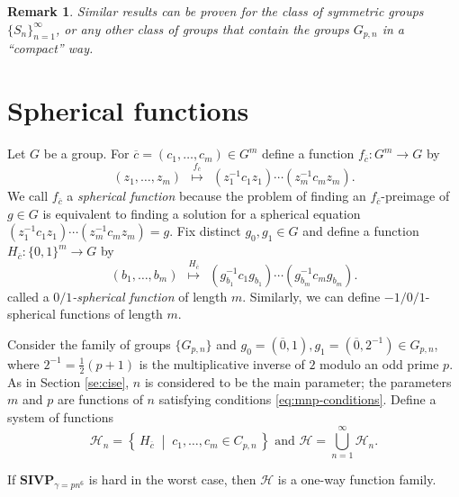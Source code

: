 \documentclass{jgcc}
\newtheorem{remark}{Remark}
\def\ovc{{\overline{c}}}
\def\ovo{{\overline{0}}}
\def\CH{{\mathcal H}}
\def\SIVP{{\mathbf{SIVP}}}
\newcommand{\Set}[2]{\left\{\, #1 \;\middle|\; #2 \,\right\}}%
\begin{document}
\begin{remark}
Similar results can be proven for the class of symmetric groups 
$\{S_n\}_{n=1}^\infty$,
or any other class of groups that contain the groups $G_{p,n}$ in a ``compact'' way.
\end{remark}


\section{Spherical functions}


Let $G$ be a group.
For $\ovc=(c_1,\dots,c_m)\in G^m$ define a function $f_\ovc\colon G^m\to G$ by
$$
(z_1,\dots,z_m) 
\ \ \stackrel{f_\ovc}{\mapsto}\ \ 
(z_1^{-1} c_1 z_1)
\cdots
(z_m^{-1} c_m z_m).
$$
We call $f_\ovc$ a \emph{spherical function} because the problem of finding
an $f_\ovc$-preimage of $g\in G$ is equivalent to finding a solution 
for a spherical equation
$(z_1^{-1} c_1 z_1)
\cdots
(z_m^{-1} c_m z_m)=g
$.
Fix distinct $g_0,g_1\in G$ and define a function $H_\ovc\colon \{0,1\}^m\to G$ by
$$
(b_1,\dots,b_m)
\ \ \stackrel{H_\ovc}{\mapsto}\ \ 
(g_{b_1}^{-1} c_1 g_{b_1})
\cdots
(g_{b_m}^{-1} c_m g_{b_m}).
$$ 
called a \emph{$0/1$-spherical function} of length $m$.
Similarly, we can define $-1/0/1$-spherical functions of length $m$.

Consider the family of groups $\{G_{p,n}\}$ and
$g_0=(\ovo,1), g_1=(\ovo,2^{-1})\in G_{p,n}$, where $2^{-1}=\tfrac{1}{2}(p+1)$ is 
the multiplicative inverse of $2$ modulo an odd prime $p$.
As in Section \ref{se:cise}, $n$ is considered to be the main parameter;
the parameters $m$ and $p$ are functions of $n$ satisfying conditions 
\eqref{eq:mnp-conditions}.
Define a system of functions
$$
\CH_n=\Set{H_\ovc}{c_1,\dots,c_m\in C_{p,n}}
\mbox{ and }
\CH= \bigcup_{n=1}^\infty \CH_n.
$$


\begin{prop}\label{pr:one-way}
If $\SIVP_{\gamma=pn^6}$ is hard in the worst case, then
$\CH$ is a one-way function family.
\end{prop}
\end{document}
